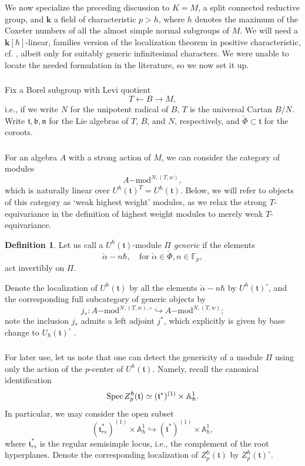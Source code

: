 \documentclass{amsart}
\theoremstyle{definition}
\newtheorem{defi}[Thm]{Definition}
\newcommand{\halpha}{\check{\alpha}}
\newcommand{\lmod}{\on{-mod}}
\newcommand{\sss}{\subsubsection{}}
\newcommand{\Spec}{\on{Spec}\hspace{.5mm}}
\newcommand{\ft}{\mathfrak{t}}
\newcommand{\on}{\mathrm}
\newcommand{\bk}{\mathbf{k}}
\newcommand{\cM}{\Pi}
\numberwithin{equation}{section}
\begin{document}
\sss We now specialize the preceding discussion to $K = M$, a split connected reductive group, and $\bk$ a field of characteristic $p > h$, where $h$ denotes the maximum of the Coxeter numbers of all the almost simple normal subgroups of $M$. We will need a $\bk[\hbar]$-linear, families version of the localization theorem in positive characteristic, cf. \cite{BMR}, albeit only for suitably generic infinitesimal characters. We were unable to locate the needed formulation in the literature, so we now set it up. 


\sss Fix a Borel subgroup with Levi quotient
$$T \leftarrow B \rightarrow M,$$
i.e., if we write $N$ for the unipotent radical of $B$, $T$ is the universal Cartan $B/N$. Write  {$\mathfrak{t}, \mathfrak{b}, \mathfrak{n}$ for the Lie algebras of $T$, $B$, and $N$, respectively,} and $\check{\Phi} \subset \mathfrak{t}$ for the coroots. 

\sss For an algebra $A$ with a strong action of $M$, we can consider the category of modules
$$A\lmod^{N, (T,w)},$$
which is naturally linear over $U^\hbar(\mathfrak{t})^T = U^\hbar(\mathfrak{t}).$ Below, we will refer to objects of this category as `weak highest weight' modules, as we relax the strong $T$-equivariance in the definition of highest weight modules to merely weak $T$-equivariance. 

\begin{defi} \label{d:genmodule}Let us call a $U^\hbar(\ft)$-module $\cM$ {\em generic} if the elements $$\halpha - n\hbar, \quad \text{for } \halpha \in \check{\Phi}, n \in \mathbb{F}_p,$$act invertibly on $\cM$.
\end{defi} 

Denote the localization of $U^\hbar(\ft)$ by all the elements $\check{\alpha}-n\hbar$ by $U^\hbar(\ft)^\circ$, and the corresponding full subcategory of generic objects by  
$$j_*: A\lmod^{N,(T,w),\circ} \hookrightarrow A\lmod^{N, (T,w) };$$ 
note the inclusion $j_*$ admits a left adjoint $j^*$, which explicitly is given by base change to $U_\hbar(\ft)^\circ$ . 

\sss For later use, let us note that one can detect the genericity of a module $\cM$ using only the action of the $p$-center of $U^\hbar(\ft)$. Namely, recall the canonical identification $$\Spec Z_p^\hbar(\ft) \simeq (\ft^{*})^{(1)} \times \mathbb{A}^1_\hbar.$$In particular, we may consider the open subset
$$(\ft^*_{rs})^{(1)} \times \mathbb{A}^1_\hbar \hookrightarrow (\ft^*)^{(1)} \times \mathbb{A}^1_\hbar,$$
where $\ft^*_{rs}$ is the regular semisimple locus, i.e., the complement of the root hyperplanes. Denote the corresponding localization of $Z^\hbar_p(\ft)$ by $Z^\hbar_p(\ft)^\circ$. 
\end{document}
